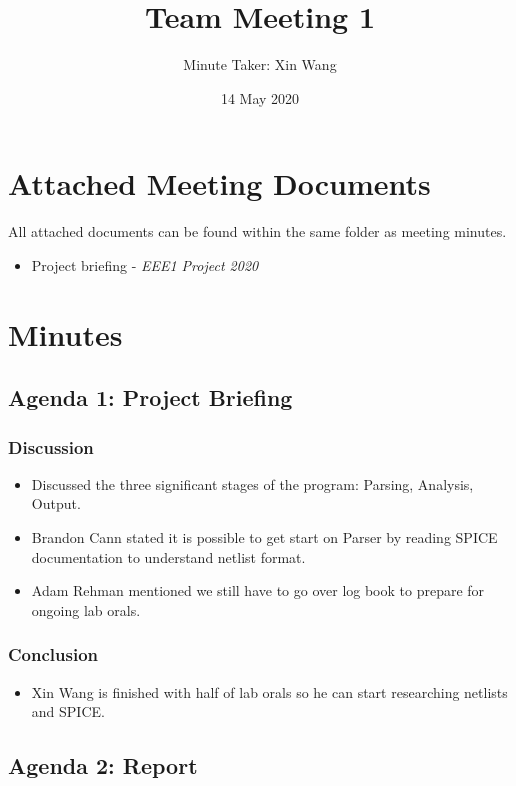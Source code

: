 \documentclass[a4paper]{article}
\author{Minute Taker: Xin Wang}
\title{Team Meeting 1}
\date{14 May 2020}
\begin{document}
\maketitle
\section{Attached Meeting Documents} 
All attached documents can be found within the same folder as meeting minutes.
\begin{itemize}
    \item Project briefing - \textit{EEE1 Project 2020}
\end{itemize}
\maketitle
\section{Minutes} 
\subsection{Agenda 1: Project Briefing}
\subsubsection{Discussion}
\begin{itemize}
    \item Discussed the three significant stages of the program: Parsing, Analysis, Output. 
    \item Brandon Cann stated it is possible to get start on Parser by reading SPICE documentation to understand 
    netlist format.
    \item Adam Rehman mentioned we still have to go over log book to prepare for ongoing lab orals.
\end{itemize}
\subsubsection{Conclusion}
\begin{itemize}
    \item Xin Wang is finished with half of lab orals so he can start researching netlists and SPICE.
\end{itemize}

\subsection{Agenda 2: Report}
\end{document}
